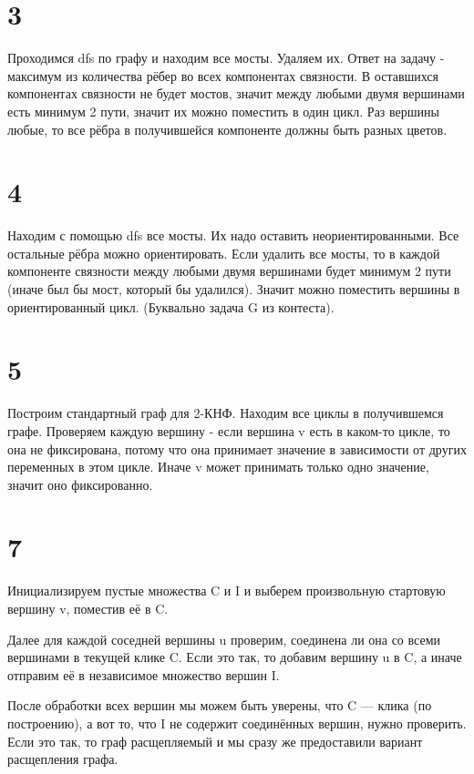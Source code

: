 \documentclass[12pt]{extarticle}
\begin{document}
\section*{3}
Проходимся dfs по графу и находим все мосты. Удаляем их. Ответ на задачу - максимум из количества рёбер во всех компонентах связности.
\newline
В оставшихся компонентах связности не будет мостов, значит между любыми двумя вершинами есть минимум 2 пути, значит их можно поместить в один цикл. Раз вершины любые, то все рёбра в получившейся компоненте должны быть разных цветов.

\section*{4}
Находим с помощью dfs все мосты. Их надо оставить неориентированными. Все остальные рёбра можно ориентировать.
\newline
Если удалить все мосты, то в каждой компоненте связности между любыми двумя вершинами будет минимум 2 пути (иначе был бы мост, который бы удалился). Значит можно поместить вершины в ориентированный цикл. (Буквально задача G из контеста).

\section*{5}
Построим стандартный граф для 2-КНФ. Находим все циклы в получившемся графе. Проверяем каждую вершину - если вершина v есть в каком-то цикле, то она не фиксирована, потому что она принимает значение в зависимости от других переменных в этом цикле. Иначе v может принимать только одно значение, значит оно фиксированно.

\section*{7}
Инициализируем пустые множества C и I и выберем произвольную стартовую вершину v, поместив
её в C.

Далее для каждой соседней вершины u проверим, соединена ли она со всеми вершинами в
текущей клике C. Если это так, то добавим вершину u в C, а иначе отправим её в независимое
множество вершин I.

После обработки всех вершин мы можем быть уверены, что C — клика (по построению), а вот
то, что I не содержит соединённых вершин, нужно проверить. Если это так, то граф расщепляемый
и мы сразу же предоставили вариант расщепления графа.
\end{document}
